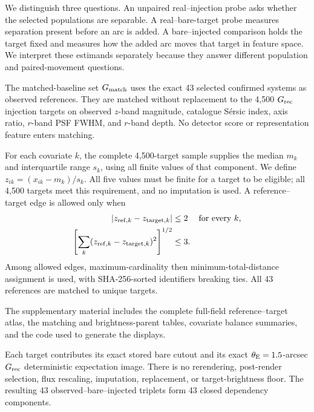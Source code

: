 We distinguish three questions. An unpaired real--injection probe asks whether
the selected populations are separable. A real--bare-target probe measures
separation present before an arc is added. A bare--injected comparison holds
the target fixed and measures how the added arc moves that target in feature
space. We interpret these estimands separately because they answer different
population and paired-movement questions.

The matched-baseline set \(G_{\rm match}\) uses the exact 43 selected confirmed
systems as observed references. They are matched without replacement to the
4,500 \(G_{\rm rec}\) injection targets on observed \(z\)-band magnitude,
catalogue S\'{e}rsic index, axis ratio, \(r\)-band PSF FWHM, and \(r\)-band
depth. No detector score or representation feature enters matching.

For each covariate \(k\), the complete 4,500-target sample supplies the median
\(m_k\) and interquartile range \(s_k\), using all finite values of that
component. We define \(z_{ik}=(x_{ik}-m_k)/s_k\). All five values must be
finite for a target to be eligible; all 4,500 targets meet this requirement,
and no imputation is used. A reference--target edge is allowed only when
\begin{equation}
\begin{aligned}
 |z_{{\rm ref},k}-z_{{\rm target},k}|&\leq2
 &&\text{for every }k,\\
 \left[\sum_k(z_{{\rm ref},k}-z_{{\rm target},k})^2\right]^{1/2}
 &\leq3 .
\end{aligned}
\label{eq:gmatch_calipers}
\end{equation}
Among allowed edges, maximum-cardinality then minimum-total-distance
assignment is used, with SHA-256-sorted identifiers breaking ties. All 43
references are matched to unique targets.

The supplementary material includes the complete full-field reference--target
atlas, the matching and brightness-parent tables, covariate balance summaries,
and the code used to generate the displays.

Each target contributes its exact stored bare cutout and its exact
\(\theta_{\rm E}=1.5\)-arcsec \(G_{\rm rec}\) deterministic expectation image. There is no
rerendering, post-render selection, flux rescaling, imputation, replacement,
or target-brightness floor. The resulting 43 observed--bare--injected
triplets form 43 closed dependency components.

